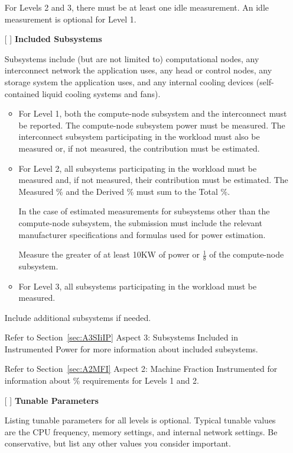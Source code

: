 \begin{itemize}
For Levels 2 and 3, there must be at least one idle measurement. An idle measurement is optional for Level 1. 

\newpage
\item[{[ ]}]
\textbf{Included Subsystems}

Subsystems include (but are not limited to) computational nodes, any interconnect network the application uses, any head or control nodes, any storage system the application uses, and any internal cooling devices (self-contained liquid cooling systems and fans).  

\begin{itemize}
\item
For Level 1, both the compute-node subsystem and the interconnect must be reported.  
The compute-node subsystem power must be measured. 
The interconnect subsystem participating in the workload must also be measured or, if not measured, the contribution must be estimated.


\item
For Level 2, all subsystems participating in the workload must be measured and, if not measured, their contribution must be estimated. The Measured \% and the Derived \% must sum to the Total \%.

In the case of estimated measurements for subsystems other than 
the compute-node subsystem, the submission must include the relevant 
manufacturer specifications and formulas used for power estimation. 

Measure the greater of at least 10KW of power or $ \frac{1}{8} $ of the compute-node subsystem.

\item
For Level 3, all subsystems participating in the workload must be measured.
\end{itemize}

Include additional subsystems if needed.

Refer to Section~\ref{sec:A3SIiIP} Aspect 3: Subsystems Included in Instrumented Power for more information about included subsystems.

Refer to Section~\ref{sec:A2MFI} Aspect 2: Machine Fraction Instrumented for information about \% requirements for Levels 1 and 2.
 
\item[{[ ]}]
\textbf{Tunable Parameters}

Listing tunable parameters for all levels is optional.
Typical tunable values are the CPU frequency, memory settings, and internal network settings. Be conservative, but list any other values you consider important.


\end{itemize}

